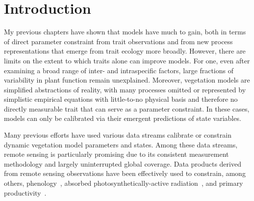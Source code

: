 \section{Introduction}

My previous chapters have shown that models have much to gain, both in terms of direct parameter constraint from trait observations and from new process representations that emerge from trait ecology more broadly.
However, there are limits on the extent to which traits alone can improve models.
For one, even after examining a broad range of inter- and intraspecific factors, large fractions of variability in plant function remain unexplained.
Moreover, vegetation models are simplified abstractions of reality, with many processes omitted or represented by simplistic empirical equations with little-to-no physical basis and therefore no directly measurable trait that can serve as a parameter constraint.
In these cases, models can only be calibrated via their emergent predictions of state variables.

Many previous efforts have used various data streams calibrate or constrain dynamic vegetation model parameters and states.
Among these data streams, remote sensing is particularly promising due to its consistent measurement methodology and largely uninterrupted global coverage.
Data products derived from remote sensing observations have been effectively used to constrain, among others,
phenology~\cite{Knorr_2010_carbon,Viskari_2015_modeldata},
absorbed photosynthetically-active radiation~\cite{Peylin_2016_stepwise,Schurmann_2016_constraining},
and primary productivity~\cite{MacBean_2018_strong}.

